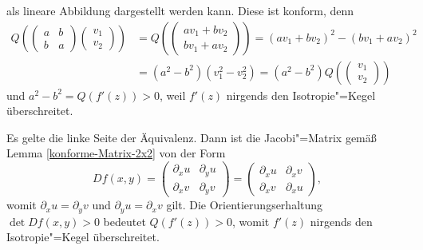 als lineare Abbildung dargestellt werden kann. Diese ist konform, denn
\begin{align}
Q(\begin{pmatrix} a & b\\ b & a\end{pmatrix}\begin{pmatrix}v_1\\ v_2\end{pmatrix})
&= Q(\begin{pmatrix}av_1 + bv_2\\ bv_1+av_2\end{pmatrix})
= (av_1 + bv_2)^2 - (bv_1+av_2)^2\\
&= (a^2 - b^2)(v_1^2 - v_2^2)
= (a^2 - b^2)Q(\begin{pmatrix}v_1\\ v_2\end{pmatrix})
\end{align}
und $a^2-b^2=Q(f'(z))>0$, weil
$f'(z)$ nirgends den Isotropie"=Kegel überschreitet.

Es gelte die linke Seite der Äquivalenz. Dann ist die Jacobi"=Matrix
gemäß Lemma \ref{konforme-Matrix-2x2} von der Form
\begin{equation}
Df(x,y) = \begin{pmatrix}
\partial_x u & \partial_y u\\
\partial_x v & \partial_y v
\end{pmatrix}
= \begin{pmatrix}
\partial_x u & \partial_x v\\
\partial_x v & \partial_x u
\end{pmatrix},
\end{equation}
womit $\partial_x u=\partial_y v$ und $\partial_y u=\partial_x v$
gilt. Die Orientierungserhaltung $\det Df(x,y)>0$
bedeutet $Q(f'(z))>0$, womit $f'(z)$ nirgends den Isotropie"=Kegel
überschreitet.\;\qedsymbol

